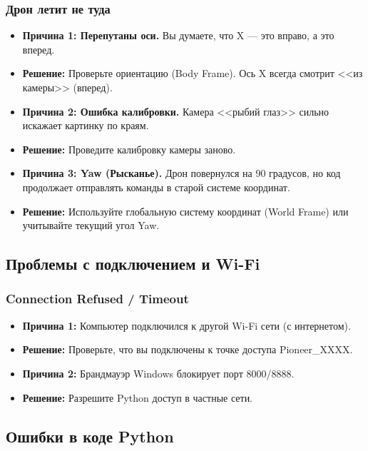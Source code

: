 \subsubsection{Дрон летит не туда}
\begin{itemize}
    \item \textbf{Причина 1: Перепутаны оси.} Вы думаете, что X — это вправо, а это вперед.
    \item \textbf{Решение:} Проверьте ориентацию (Body Frame). Ось X всегда смотрит <<из камеры>> (вперед).
    
    \item \textbf{Причина 2: Ошибка калибровки.} Камера <<рыбий глаз>> сильно искажает картинку по краям.
    \item \textbf{Решение:} Проведите калибровку камеры заново.
    
    \item \textbf{Причина 3: Yaw (Рысканье).} Дрон повернулся на 90 градусов, но код продолжает отправлять команды в старой системе координат.
    \item \textbf{Решение:} Используйте глобальную систему координат (World Frame) или учитывайте текущий угол Yaw.
\end{itemize}

\subsection{Проблемы с подключением и Wi-Fi}

\subsubsection{Connection Refused / Timeout}
\begin{itemize}
    \item \textbf{Причина 1:} Компьютер подключился к другой Wi-Fi сети (с интернетом).
    \item \textbf{Решение:} Проверьте, что вы подключены к точке доступа Pioneer\_XXXX.
    
    \item \textbf{Причина 2:} Брандмауэр Windows блокирует порт 8000/8888.
    \item \textbf{Решение:} Разрешите Python доступ в частные сети.
\end{itemize}

\subsection{Ошибки в коде Python}

